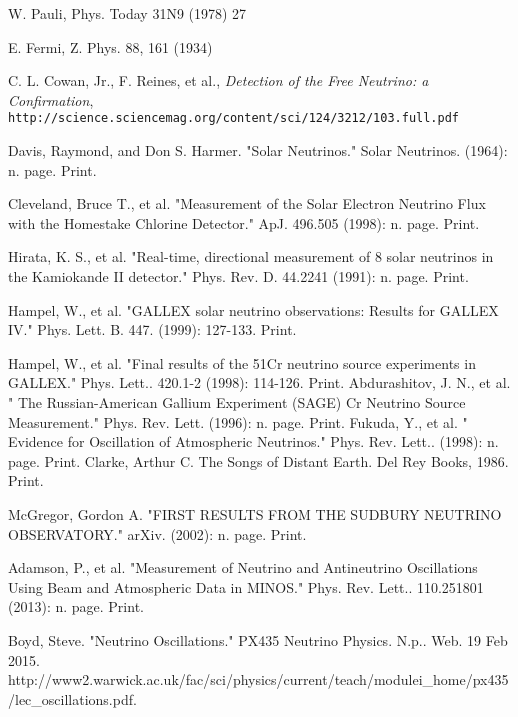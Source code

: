 \documentclass[12pt]{article}
\begin{document}
\newpage
\begin{thebibliography}{20} %
\singlespacing


W. Pauli, Phys. Today 31N9 (1978) 27

E. Fermi, Z. Phys. 88, 161 (1934)

  C. L. Cowan, Jr., F. Reines, et al., \emph{Detection of the Free Neutrino: a Confirmation}, \\
  \texttt{http://science.sciencemag.org/content/sci/124/3212/103.full.pdf}

Davis, Raymond, and Don S. Harmer. "Solar Neutrinos." Solar Neutrinos. (1964): n. page. Print.

Cleveland, Bruce T., et al. "Measurement of the Solar Electron Neutrino Flux with the Homestake Chlorine Detector." ApJ. 496.505 (1998): n. page. Print.

Hirata, K. S., et al. "Real-time, directional measurement of 8 solar neutrinos in the Kamiokande II detector." Phys. Rev. D. 44.2241 (1991): n. page. Print.

Hampel, W., et al. "GALLEX solar neutrino observations: Results for GALLEX IV." Phys. Lett. B. 447. (1999): 127-133. Print.

Hampel, W., et al. "Final results of the 51Cr neutrino source experiments in GALLEX." Phys. Lett.. 420.1-2 (1998): 114-126. Print.
Abdurashitov, J. N., et al. " The Russian-American Gallium Experiment (SAGE) Cr Neutrino Source Measurement."  Phys. Rev. Lett. (1996): n. page. Print.
Fukuda, Y., et al. " Evidence for Oscillation of Atmospheric Neutrinos."  Phys. Rev. Lett.. (1998): n. page. Print.
Clarke, Arthur C. The Songs of Distant Earth. Del Rey Books, 1986. Print.

McGregor, Gordon A. "FIRST RESULTS FROM THE SUDBURY NEUTRINO OBSERVATORY." arXiv. (2002): n. page. Print.

Adamson, P., et al. "Measurement of Neutrino and Antineutrino Oscillations Using Beam and Atmospheric Data in MINOS."  Phys. Rev. Lett.. 110.251801 (2013): n. page. Print.

Boyd, Steve. "Neutrino Oscillations." PX435 Neutrino Physics. N.p.. Web. 19 Feb 2015. http://www2.warwick.ac.uk/fac/sci/physics/current/teach/modulei\_home/px435/lec\_oscillations.pdf.


\end{thebibliography}
\end{document}
